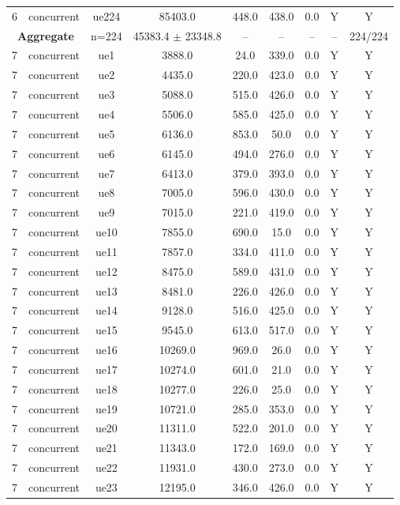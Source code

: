\begin{table}[ht]
\begin{tabular}{|c|c|c|c|c|c|c|c|c|}
6 & concurrent & ue224 & 85403.0 & 448.0 & 438.0 & 0.0 & Y & Y \\
\multicolumn{2}{|c|}{\textbf{Aggregate}} & n=224 & 45383.4 $\pm$ 23348.8 & -- & -- & -- & -- & 224/224 \\
\hline
7 & concurrent & ue1 & 3888.0 & 24.0 & 339.0 & 0.0 & Y & Y \\
7 & concurrent & ue2 & 4435.0 & 220.0 & 423.0 & 0.0 & Y & Y \\
7 & concurrent & ue3 & 5088.0 & 515.0 & 426.0 & 0.0 & Y & Y \\
7 & concurrent & ue4 & 5506.0 & 585.0 & 425.0 & 0.0 & Y & Y \\
7 & concurrent & ue5 & 6136.0 & 853.0 & 50.0 & 0.0 & Y & Y \\
7 & concurrent & ue6 & 6145.0 & 494.0 & 276.0 & 0.0 & Y & Y \\
7 & concurrent & ue7 & 6413.0 & 379.0 & 393.0 & 0.0 & Y & Y \\
7 & concurrent & ue8 & 7005.0 & 596.0 & 430.0 & 0.0 & Y & Y \\
7 & concurrent & ue9 & 7015.0 & 221.0 & 419.0 & 0.0 & Y & Y \\
7 & concurrent & ue10 & 7855.0 & 690.0 & 15.0 & 0.0 & Y & Y \\
7 & concurrent & ue11 & 7857.0 & 334.0 & 411.0 & 0.0 & Y & Y \\
7 & concurrent & ue12 & 8475.0 & 589.0 & 431.0 & 0.0 & Y & Y \\
7 & concurrent & ue13 & 8481.0 & 226.0 & 426.0 & 0.0 & Y & Y \\
7 & concurrent & ue14 & 9128.0 & 516.0 & 425.0 & 0.0 & Y & Y \\
7 & concurrent & ue15 & 9545.0 & 613.0 & 517.0 & 0.0 & Y & Y \\
7 & concurrent & ue16 & 10269.0 & 969.0 & 26.0 & 0.0 & Y & Y \\
7 & concurrent & ue17 & 10274.0 & 601.0 & 21.0 & 0.0 & Y & Y \\
7 & concurrent & ue18 & 10277.0 & 226.0 & 25.0 & 0.0 & Y & Y \\
7 & concurrent & ue19 & 10721.0 & 285.0 & 353.0 & 0.0 & Y & Y \\
7 & concurrent & ue20 & 11311.0 & 522.0 & 201.0 & 0.0 & Y & Y \\
7 & concurrent & ue21 & 11343.0 & 172.0 & 169.0 & 0.0 & Y & Y \\
7 & concurrent & ue22 & 11931.0 & 430.0 & 273.0 & 0.0 & Y & Y \\
7 & concurrent & ue23 & 12195.0 & 346.0 & 426.0 & 0.0 & Y & Y \\

\end{tabular}
\end{table}
